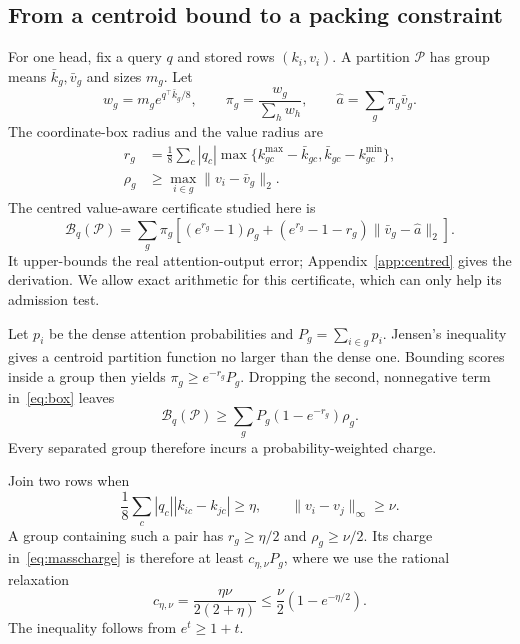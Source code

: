 \documentclass[10pt]{article}
\theoremstyle{definition}\newtheorem{definition}[theorem]{Definition}
\newcommand{\B}{\mathcal B}
\newcommand{\Pcal}{\mathcal P}
\begin{document}
\subsection{From a centroid bound to a packing constraint}
For one head, fix a query $q$ and stored rows $(k_i,v_i)$. A partition $\Pcal$ has group means $\bar k_g,\bar v_g$ and sizes $m_g$. Let
\[
 w_g=m_g e^{q^\top\bar k_g/8},\qquad
 \pi_g=\frac{w_g}{\sum_h w_h},\qquad
 \hat a=\sum_g\pi_g\bar v_g.
\]
The coordinate-box radius and the value radius are
\begin{align}
 r_g&=\frac18\sum_c|q_c|
 \max\{k^{\max}_{gc}-\bar k_{gc},\bar k_{gc}-k^{\min}_{gc}\},\\
 \rho_g&\geq\max_{i\in g}\|v_i-\bar v_g\|_2.
\end{align}
The centred value-aware certificate studied here is
\begin{equation}\label{eq:box}
 \B_q(\Pcal)=\sum_g\pi_g\left[
 (e^{r_g}-1)\rho_g+
 (e^{r_g}-1-r_g)\|\bar v_g-\hat a\|_2\right].
\end{equation}
It upper-bounds the real attention-output error; Appendix~\ref{app:centred} gives the derivation. We allow exact arithmetic for this certificate, which can only help its admission test.

Let $p_i$ be the dense attention probabilities and $P_g=\sum_{i\in g}p_i$. Jensen's inequality gives a centroid partition function no larger than the dense one. Bounding scores inside a group then yields $\pi_g\geq e^{-r_g}P_g$. Dropping the second, nonnegative term in~\eqref{eq:box} leaves
\begin{equation}\label{eq:masscharge}
 \B_q(\Pcal)\geq\sum_g P_g(1-e^{-r_g})\rho_g.
\end{equation}
Every separated group therefore incurs a probability-weighted charge.

Join two rows when
\[
 \frac18\sum_c|q_c||k_{ic}-k_{jc}|\geq\eta,
 \qquad \|v_i-v_j\|_\infty\geq\nu.
\]
A group containing such a pair has $r_g\geq\eta/2$ and $\rho_g\geq\nu/2$. Its charge in~\eqref{eq:masscharge} is therefore at least $c_{\eta,\nu}P_g$, where we use the rational relaxation
\begin{equation}\label{eq:charge}
 c_{\eta,\nu}=\frac{\eta\nu}{2(2+\eta)}
 \leq \frac\nu2(1-e^{-\eta/2}).
\end{equation}
The inequality follows from $e^t\geq1+t$.
\end{document}
